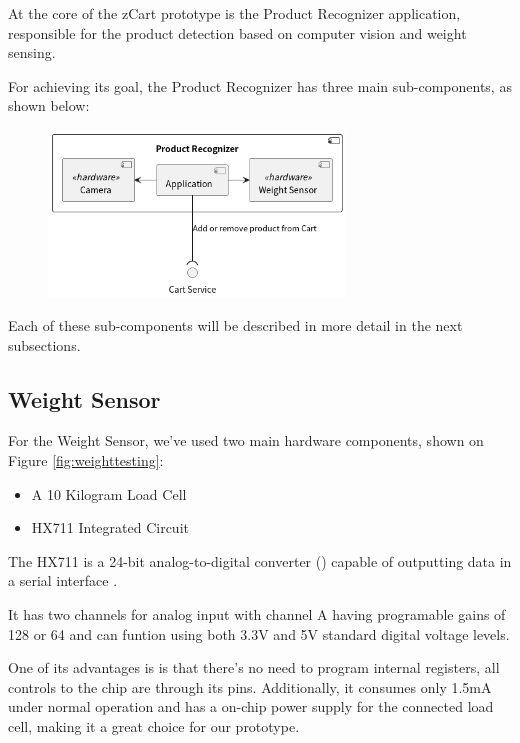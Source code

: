 \documentclass[openright]{normas-utf-tex} %
\begin{document}
At the core of the zCart prototype is the Product Recognizer application,
responsible for the product detection based on computer vision and weight
sensing.

For achieving its goal, the Product Recognizer has three main sub-components, as shown below:
\begin{figure}[H]
	\centering
	\includegraphics[width=0.7\textwidth]{./images/diagrams/ProductRecognizer.png}
	\caption[]{}
	\label{fig:dummy}
\end{figure}

Each of these sub-components will be described in more detail in the next subsections.

\subsection{Weight Sensor}

For the Weight Sensor, we've used two main hardware components, shown on Figure \ref{fig:weighttesting}:
\begin{itemize}
    \item  A 10 Kilogram Load Cell
    \item HX711 Integrated Circuit
\end{itemize}

The HX711 is a 24-bit analog-to-digital converter ()
capable of outputting data in a serial interface \cite{Avia2022}.

It has two channels for analog input with channel A having programable gains of 128 or 64 and
can funtion using both 3.3V and 5V standard digital voltage levels.

One of its advantages is is that there's no need to program internal registers,
all controls to the chip are through its pins. Additionally, it consumes only
1.5mA under normal operation and has a on-chip power supply for the connected
load cell, making it a great choice for our prototype.
\end{document}
